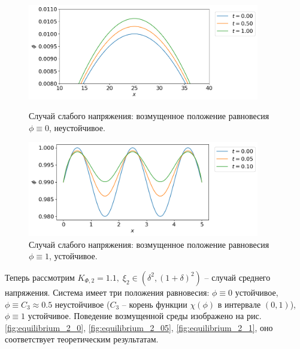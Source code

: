 \begin{figure}[!t]
    \centering
    \includegraphics[width=0.9\textwidth]{figures/equilibrium_1_0.png}
    \vspace{-0.3cm}
    \caption{Случай слабого напряжения: возмущенное положение равновесия $\phi \equiv 0$, неустойчивое.}
    \label{fig:equilibrium_1_0}
    \vspace{0.5cm}
    
    \includegraphics[width=0.9\textwidth]{figures/equilibrium_1_1.png}
    \vspace{-0.3cm}
    \caption{Случай слабого напряжения: возмущенное положение равновесия $\phi \equiv 1$, устойчивое.}
    \label{fig:equilibrium_1_1}
\end{figure}

Теперь рассмотрим $K_{\Phi, 2} = 1.1, \; \xi_2 \in (\delta^2, (1 + \delta)^2)$ -- случай среднего напряжения. Система имеет три положения равновесия: $\phi \equiv 0$ устойчивое, $\phi \equiv C_3 \approx 0.5$ неустойчивое ($C_3$ -- корень функции $\chi(\phi)$ в интервале $(0, 1)$), $\phi \equiv 1$ устойчивое. Поведение возмущенной среды изображено на рис. \ref{fig:equilibrium_2_0}, \ref{fig:equilibrium_2_05}, \ref{fig:equilibrium_2_1}, оно соответствует теоретическим результатам.

